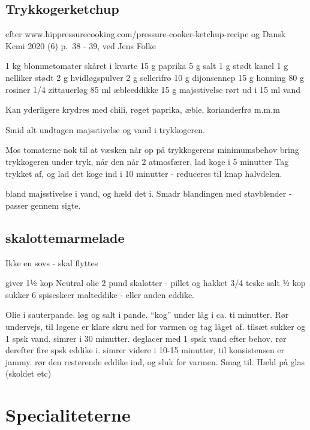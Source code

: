 \documentclass[
]{book}
\begin{document}
\hypertarget{trykkogerketchup}{%
\section{Trykkogerketchup}\label{trykkogerketchup}}

efter www.hippressurecooking.com/pressure-cooker-ketchup-recipe
og Dansk Kemi 2020 (6) p.~38 - 39, ved Jens Folke

1 kg blommetomater skåret i kvarte
15 g paprika
5 g salt
1 g stødt kanel
1 g nelliker stødt
2 g hvidløgspulver
2 g sellerifrø
10 g dijonsennep
15 g honning
80 g rosiner
1/4 zittauerløg
85 ml æbleeddikke
15 g majsstivelse rørt ud i 15 ml vand

Kan yderligere krydres med chili, røget paprika, æble, korianderfrø
m.m.m

Smid alt undtagen majsstivelse og vand i trykkogeren.

Mos tomaterne nok til at væsken når op på trykkogerens minimumsbehov
bring trykkogeren under tryk, når den når 2 atmosfærer, lad koge i
5 minutter
Tag trykket af, og lad det koge ind i 10 minutter - reduceres til knap
halvdelen.

bland majsstivelse i vand, og hæld det i.
Smadr blandingen med stavblender - passer gennem sigte.

\hypertarget{skalottemarmelade}{%
\section{skalottemarmelade}\label{skalottemarmelade}}

Ikke en sovs - skal flyttes

giver 1½ kop
Neutral olie
2 pund skalotter - pillet og hakket
3/4 teske salt
½ kop sukker
6 spiseskeer malteddike - eller anden eddike.

Olie i sauterpande.
løg og salt i pande.
``kog'' under låg i ca. ti minutter. Rør undervejs, til løgene er klare
skru ned for varmen og tag låget af.
tilsæt sukker og 1 spsk vand. simrer i 30 minutter. deglacer med 1 spsk vand efter behov.
rør derefter fire spsk eddike i. simrer videre i 10-15 minutter, til konsistensen er jammy.
rør den resterende eddike ind, og sluk for varmen.
Smag til.
Hæld på glas (skoldet etc)

\hypertarget{specialiteterne}{%
\chapter{Specialiteterne}\label{specialiteterne}}
\end{document}
